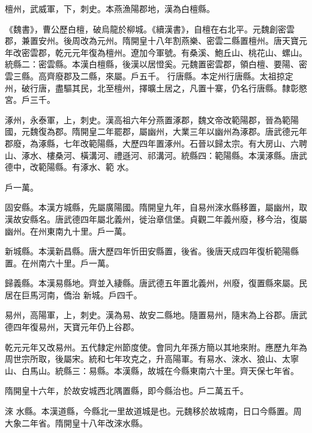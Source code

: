 \begin{pinyinscope}
 檀州，武威軍，下，刺史。本燕漁陽郡地，漢為白檀縣。



 《魏書》，曹公歷白檀，破烏龍於柳城。《續漢書》，自檀在右北平。元魏創密雲郡，兼置安州。後周改為元州。隋開皇十八年割燕樂、密雲二縣置檀州。唐天寶元年改密雲郡，乾元元年復為檀州。遼加今軍號。有桑溪、鮑丘山、桃花山、螺山。統縣二：密雲縣。本漢白檀縣，後漢以居憕奚。元魏置密雲郡，領白檀、要陽、密雲三縣。高齊廢郡及二縣，來屬。戶五千。
 行唐縣。本定州行唐縣。太祖掠定州，破行唐，盡驅其民，北至檀州，擇曠土居之，凡置十寨，仍名行唐縣。隸彰愍宮。戶三千。



 涿州，永泰軍，上，刺史。漢高祖六年分燕置涿郡，魏文帝改範陽郡，晉為範陽國，元魏復為郡。隋開皇二年罷郡，屬幽州，大業三年以幽州為涿郡。唐武德元年郡廢，為涿縣，七年改範陽縣，大歷四年置涿州。石晉以歸太宗。有大房山、六聘山、涿水、樓桑河、橫溝河、禮遜河、祁溝河。統縣四：範陽縣。本漢涿縣。唐武德中，改範陽縣。有涿水、範
 水。



 戶一萬。



 固安縣。本漢方城縣，先屬廣陽國。隋開皇九年，自易州淶水縣移置，屬幽州，取漢故安縣名。唐武德四年屬北義州，徙治章信堡。貞觀二年義州廢，移今治，復屬幽州。在州東南九十里。戶一萬。



 新城縣。本漢新昌縣。唐大歷四年忻田安縣置，後省。後唐天成四年復析範陽縣置。在州南六十里。戶一萬。



 歸義縣。本漢易縣地。齊並入緀縣。唐武德五年置北義州，州廢，復置縣來屬。民居在巨馬河南，僑治
 新城。戶四千。



 易州，高陽軍，上，刺史。漢為易、故安二縣地。隨置易州，隨末為上谷郡。唐武德四年復易州，天寶元年仍上谷郡。



 乾元元年又改易州。五代隸定州節度使。會同九年孫方簡以其地來附。應歷九年為周世宗所取，後屬宋。統和七年攻克之，升高陽軍。有易水、淶水、狼山、太寧山、白馬山。統縣三：易縣。本漢縣，故城在今縣東南六十里。齊天保七年省。



 隋開皇十六年，於故安城西北隅置縣，即今縣治也。戶二萬五千。



 淶
 水縣。本漢道縣，今縣北一里故道城是也。元魏移於故城南，日口今縣置。周大象二年省。隋開皇十八年改淶水縣。




\end{pinyinscope}
